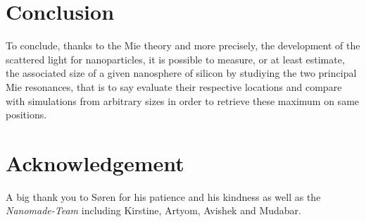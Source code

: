 \documentclass{article}
\numberwithin{equation}{section}
\begin{document}
\section{Conclusion}

To conclude, thanks to the Mie theory and more precisely, the development of the scattered light for nanoparticles, it is possible to measure, or at least estimate, the associated size of a given nanosphere of silicon by studiying the two principal Mie resonances, that is to say evaluate their respective locations and compare with simulations from arbitrary sizes in order to retrieve these maximum on same positions.

\section{Acknowledgement}

A big thank you to Søren for his patience and his kindness as well as the \textit{Nanomade-Team} including Kirstine, Artyom, Avishek and Mudabar.

\printbibliography
\end{document}

